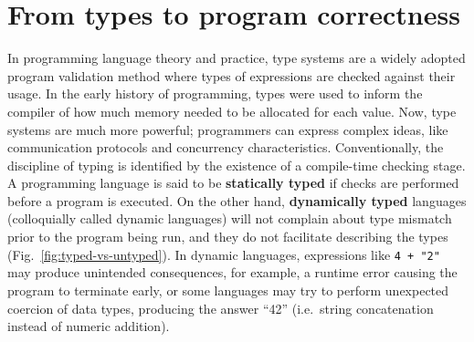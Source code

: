 







\section{From types to program correctness}
\label{sec:typing}
In programming language theory and practice, type systems are a widely adopted program validation method where types of expressions are checked against their usage. In the early history of programming, types were used to inform the compiler of how much memory needed to be allocated for each value. Now, type systems are much more powerful; programmers can express complex ideas, like communication protocols and concurrency characteristics. Conventionally, the discipline of typing is identified by the existence of a compile-time checking stage. A programming language is said to be \textbf{statically typed} if checks are performed before a program is executed.  On the other hand, \textbf{dynamically typed} languages (colloquially called dynamic languages) will not complain about type mismatch prior to the program being run, and they do not facilitate describing the types (Fig.\ \ref{fig:typed-vs-untyped}). In dynamic languages, expressions like \texttt{4 + "2"} may produce unintended consequences, for example, a runtime error causing the program to terminate early, or some languages may try to perform unexpected coercion of data types, producing the answer ``42'' (i.e.\ string concatenation instead of numeric addition). 

